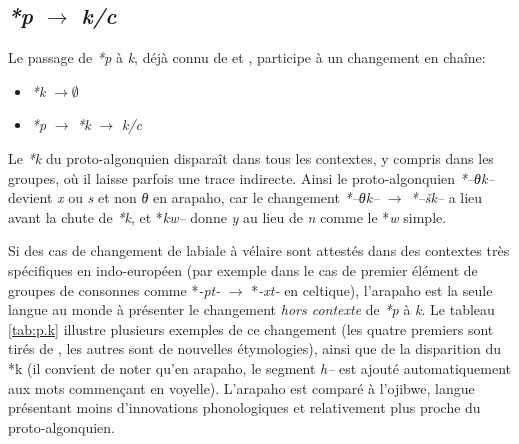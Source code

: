 \documentclass[twoside,a4paper,11pt]{article}
\newcommand{\ipa}[1]{{\phon\textit{#1}}}
\newcommand{\Σ}{\greek{Σ}}
\begin{document}
\subsection{\ipa{*p} $\rightarrow$ \ipa{k/c} }
Le passage de \ipa{*p} à \ipa{k}, déjà connu de \citet{kroeber16arapaho} et \citet{michelson35shifts}, participe à un changement en chaîne:

\begin{itemize}
\item \ipa{*k} $\rightarrow \emptyset$
\item \ipa{*p} $\rightarrow$ \ipa{*k} $\rightarrow$  \ipa{k/c}
\end{itemize}

Le  \ipa{*k} du proto-algonquien disparaît dans tous les contextes, y compris dans les groupes, où il laisse parfois une trace indirecte. Ainsi le proto-algonquien \ipa{*--θk--} devient \ipa{x} ou \ipa{s} et non \ipa{θ} en arapaho, car le changement \ipa{*--θk--} $\rightarrow $  \ipa{*--šk--} a lieu avant la chute de \ipa{*k}, et *\ipa{kw--} donne \ipa{y} au lieu de \ipa{n} comme le *\ipa{w} simple.

Si des cas de changement de labiale à vélaire sont attestés dans des contextes très spécifiques en indo-européen (par exemple dans le cas de premier élément de groupes de consonnes comme *\ipa{-pt-} $\rightarrow$ *\ipa{-xt-} en celtique), l'arapaho est la seule langue au monde à présenter le changement \textit{hors contexte} de  \ipa{*p} à \ipa{k}. Le tableau \ref{tab:p.k} illustre plusieurs exemples de ce changement (les quatre premiers sont tirés de  \citealt{goddard74arapaho}, les autres sont de nouvelles étymologies), ainsi que de la disparition du *k (il convient de noter qu'en arapaho, le segment \ipa{h--} est ajouté automatiquement aux mots commençant en voyelle). L'arapaho est comparé à l'ojibwe, langue présentant moins d'innovations phonologiques et relativement plus proche du proto-algonquien.
\end{document}
